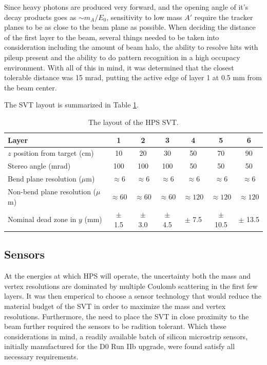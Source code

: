 Since heavy photons are produced very forward, and the opening angle of it's 
decay products goes as $\sim m_{A}/E_{0}$, sensitivity to low mass $A'$ require
the tracker planes to be as close to the beam plane as possible.  When deciding
the distance of the first layer to the beam, several things  needed to be taken
into consideration including the amount of beam halo, the ability to resolve 
hits with pileup present and the ability to do pattern recognition in a high 
occupacy environment.  With all of this in mind, it was determined that the 
closest tolerable distance was 15 mrad, putting the active edge of layer 1 
at 0.5 mm from the beam center.  

The SVT layout is summarized in Table \ref{tab:svt_layout}.

\begin{table}[t]
 \begin{center}
\begin{tabular}{l|cccccc}  
\hline
Layer & 1 & 2 & 3 & 4 & 5 & 6 \\ \hline
$z$ position from target (cm)    & 10 & 20 & 30 & 50 & 70 & 90 \\
Stereo angle (mrad) & 100 & 100 & 100 & 50 & 50 & 50 \\
Bend plane resolution ($\mu$m) & $\approx$6 & $\approx$6 & $\approx$6 & $\approx$6 & $\approx$6 & $\approx$6 \\
Non-bend plane resolution ($\mu$m) & $\approx60$ & $\approx60$ & $\approx60$ & $\approx120$ & $\approx120$ & $\approx120$ \\
Nominal dead zone in $y$ (mm) & $\pm$ 1.5 & $\pm$ 3.0 & $\pm$ 4.5 & $\pm$ 7.5 & $\pm$ 10.5 & $\pm$ 13.5 \\ 
\hline
\end{tabular}
\caption{The layout of the HPS SVT.}
\label{tab:svt_layout}
\end{center}
\end{table}

\subsection*{Sensors}

At the energies at which HPS will operate, the uncertainty both the mass and
vertex resolutions are dominated by multiple Coulomb scattering in the first 
few layers.  It was then emperical to choose a sensor technology that would 
reduce the material budget of the SVT in order to maximize the mass and vertex
resolutions.  Furthermore, the need to place the SVT in close proximity to the 
beam further required the sensors to be radition tolerant.  Which these 
considerations in mind, a readily available batch of silicon microstrip sensors,
initially manufactured for the D0 Run IIb upgrade, were found satisfy all 
necessary requirements.


